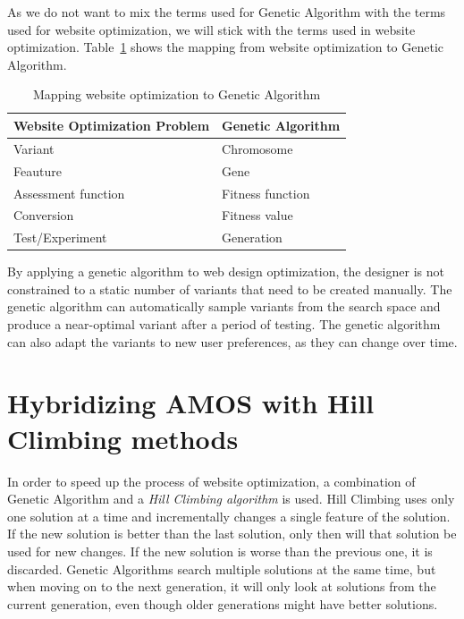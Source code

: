 \documentclass{report}
\begin{document}
As we do not want to mix the terms used for Genetic Algorithm with the terms used for website optimization, we will stick with the terms used in website optimization. Table~\ref{tab:map} shows the mapping from website optimization to Genetic Algorithm.
\FloatBarrier
\begin{table}[h]
	\centering
	\begin{tabular}{|l|l|}
		\hline
		\textbf{Website Optimization Problem} & \textbf{Genetic Algorithm} \\ \hline
		Variant                               & Chromosome                 \\ \hline
		Feauture                              & Gene                       \\ \hline
		Assessment function                   & Fitness function           \\ \hline
		Conversion                            & Fitness value              \\ \hline
		Test/Experiment                       & Generation                 \\ \hline
	\end{tabular}
	\caption{Mapping website optimization to Genetic Algorithm}
	\label{tab:map}
\end{table}
\FloatBarrier

By applying a genetic algorithm to web design optimization, the designer is not constrained to a static number of variants that need to be created manually. The genetic algorithm can automatically sample variants from the search space and produce a near-optimal variant after a period of testing. The genetic algorithm can also adapt the variants to new user preferences, as they can change over time.

\section{Hybridizing AMOS with Hill Climbing methods}
In order to speed up the process of website optimization, a combination of Genetic Algorithm and a \textit{Hill Climbing algorithm} is used. Hill Climbing uses only one solution at a time and  incrementally changes a single feature  of the solution.~\cite{russell2003artificial} If the new solution is better than the last solution, only then will that solution be used for new changes. If the new solution is worse than the previous one, it is discarded. Genetic Algorithms search multiple solutions at the same time, but when moving on to the next generation, it will only look at solutions from the current generation, even though older generations might have better solutions.\\ 
\end{document}
